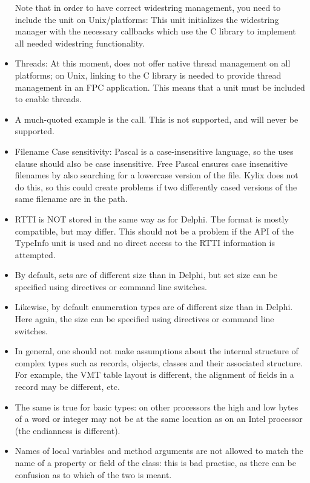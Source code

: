 \begin{itemize}
Note that in order to have correct widestring management, you need to
include the  unit on Unix/\linux platforms: This unit
initializes the widestring manager with the necessary callbacks which
use the C library to implement all needed widestring functionality.
\item Threads: At this moment, \fpc does not offer native thread
management on all platforms; on Unix, linking to the C library is
needed to provide thread management in an FPC application.
This means that a  unit must be included to enable
threads.
\item A much-quoted example is the  call.
This is not supported, and will never be supported.
\item Filename Case sensitivity: Pascal is a case-insensitive language,
so the uses clause should also be case insensitive. Free Pascal ensures
case insensitive filenames by also searching for a lowercase version
of the file. Kylix does not do this, so this could create problems
if two differently cased versions of the same filename are in the path.
\item RTTI is NOT stored in the same way as for Delphi. The format is mostly compatible, but may differ. This should not be a problem if the API of the TypeInfo unit
is used and no direct access to the RTTI information is attempted.
\item By default, sets are of different size than in Delphi, but set size
can be specified using directives or command line switches.
\item Likewise, by default enumeration types are of different size than in
Delphi. Here again, the size can be specified using directives or command
line switches.
\item In general, one should not make assumptions about the internal
structure of complex types such as records, objects, classes and their
associated structure. For example, the VMT table layout is different, the
alignment of fields in a record may be different, etc.
\item The same is true for basic types: on other processors the high and low
bytes of a word or integer may not be at the same location as on an Intel
processor (the endianness is different).
\item Names of local variables and method arguments are not allowed to
match the name of a property or field of the class: this is bad practise,
as there can be confusion as to which of the two is meant.
\end{itemize}

